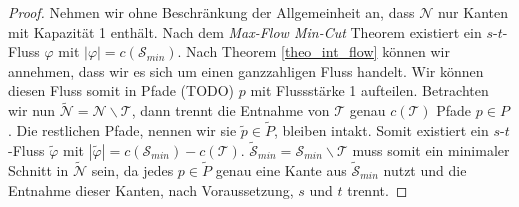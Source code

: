 \begin{proof}
Nehmen wir ohne Beschränkung der Allgemeinheit an, dass $\mathcal{N}$ nur Kanten mit Kapazität 1 enthält. Nach dem \textit{Max-Flow Min-Cut} Theorem existiert ein $s$-$t$-Fluss $\varphi$ mit $|\varphi| = c(\mathcal{S}_{min})$. Nach Theorem \ref{theo_int_flow} können wir annehmen, dass wir es sich um einen ganzzahligen Fluss handelt. Wir können diesen Fluss somit in Pfade (TODO) $p$ mit Flussstärke 1 aufteilen. Betrachten wir nun $\tilde{\mathcal{N}} = \mathcal{N} \backslash \mathcal{T}$, dann trennt die Entnahme von $\mathcal{T}$ genau $c(\mathcal{T})$ Pfade $p \in P$. Die restlichen Pfade, nennen wir sie $\tilde{p} \in \tilde{P}$, bleiben intakt. Somit existiert ein $s$-$t$-Fluss $\tilde{\varphi}$ mit $|\tilde{\varphi}| = c(\mathcal{S}_{min}) - c(\mathcal{T})$. $\tilde{\mathcal{S}}_{min} = \mathcal{S}_{min} \backslash \mathcal{T}$ muss somit ein minimaler Schnitt in $\tilde{\mathcal{N}}$ sein, da jedes $p \in \tilde{P}$ genau eine Kante aus $\tilde{\mathcal{S}}_{min}$ nutzt und die Entnahme dieser Kanten, nach Voraussetzung, $s$ und $t$ trennt.
\end{proof}


